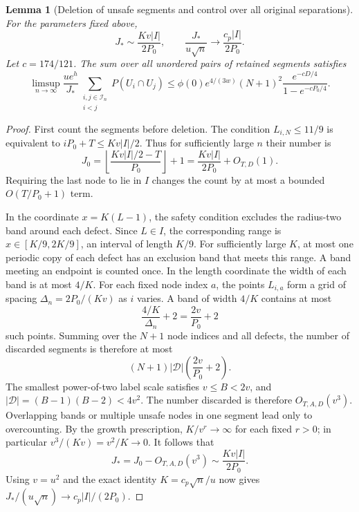 \documentclass[a4paper,11pt]{article}
\newtheorem{lemma}{Lemma}[section]
\theoremstyle{remark}
\begin{document}
\begin{lemma}[Deletion of unsafe segments and control over all original separations]\label{lem:paperpackets}
For the parameters fixed above,
\[
 J_*\sim\frac{Kv|I|}{2P_0},\qquad
 \frac{J_*}{u\sqrt n}\longrightarrow\frac{c_p|I|}{2P_0}.
\]
Let \(c=174/121\). The sum over all unordered pairs of retained segments satisfies
\[
 \limsup_{n\to\infty}\frac{ue^h}{J_*}
 \sum_{\substack{i,j\in\mathcal I_n\\i<j}}P(U_i\cap U_j)
 \le\phi(0)e^{4/(3w)}(N+1)^2
 \frac{e^{-cD/4}}{1-e^{-cP_0/4}}.
\]
\end{lemma}
\begin{proof}
First count the segments before deletion. The condition \(L_{i,N}\le11/9\)
is equivalent to \(iP_0+T\le Kv|I|/2\). Thus for sufficiently large \(n\) their
number is
\[
 J_0=\left\lfloor\frac{Kv|I|/2-T}{P_0}\right\rfloor+1
 =\frac{Kv|I|}{2P_0}+O_{T,D}(1).
\]
Requiring the last node to lie in \(I\) changes the count by at most a bounded
\(O(T/P_0+1)\) term.

In the coordinate \(x=K(L-1)\), the safety condition excludes the radius-two
band around each defect. Since \(L\in I\), the corresponding range is
\(x\in[K/9,2K/9]\), an interval of length \(K/9\).
For sufficiently large \(K\), at most one periodic copy of each defect has an
exclusion band that meets this range. A band meeting an endpoint is counted
once. In the length coordinate the width of each band is at most \(4/K\).
For each fixed node index \(a\), the points \(L_{i,a}\) form a grid of spacing
\(\Delta_n=2P_0/(Kv)\) as \(i\) varies. A band of width \(4/K\) contains at
most
\[
 \frac{4/K}{\Delta_n}+2=\frac{2v}{P_0}+2
\]
such points. Summing over the \(N+1\) node indices and all defects, the number
of discarded segments is therefore at most
\[
 (N+1)|\mathcal D|\left(\frac{2v}{P_0}+2\right).
\]
The smallest power-of-two label scale satisfies \(v\le B<2v\), and
\(|\mathcal D|=(B-1)(B-2)<4v^2\). The number discarded is therefore
\(O_{T,A,D}(v^3)\). Overlapping bands or multiple unsafe nodes in one segment
lead only to overcounting. By the growth prescription, \(K/v^r\to\infty\)
for each fixed \(r>0\); in particular \(v^3/(Kv)=v^2/K\to0\). It follows that
\[
 J_*=J_0-O_{T,A,D}(v^3)
 \sim\frac{Kv|I|}{2P_0}.
\]
Using \(v=u^2\) and the exact identity \(K=c_p\sqrt n/u\) now gives
\(J_* /(u\sqrt n)\to c_p|I|/(2P_0)\).


\end{proof}
\end{document}
